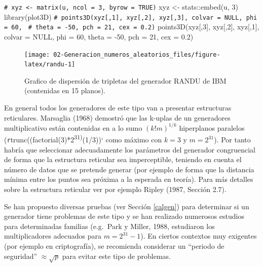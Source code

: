 \documentclass[
]{book}
\newenvironment{Shaded}{\begin{snugshade}}{\end{snugshade}}
\newcommand{\AttributeTok}[1]{\textcolor[rgb]{0.77,0.63,0.00}{#1}}
\newcommand{\CommentTok}[1]{\textcolor[rgb]{0.56,0.35,0.01}{\textit{#1}}}
\newcommand{\ConstantTok}[1]{\textcolor[rgb]{0.00,0.00,0.00}{#1}}
\newcommand{\DecValTok}[1]{\textcolor[rgb]{0.00,0.00,0.81}{#1}}
\newcommand{\FloatTok}[1]{\textcolor[rgb]{0.00,0.00,0.81}{#1}}
\newcommand{\FunctionTok}[1]{\textcolor[rgb]{0.00,0.00,0.00}{#1}}
\newcommand{\NormalTok}[1]{#1}
\newcommand{\OtherTok}[1]{\textcolor[rgb]{0.56,0.35,0.01}{#1}}
\newcommand{\SpecialCharTok}[1]{\textcolor[rgb]{0.00,0.00,0.00}{#1}}
\theoremstyle{break}
\theoremstyle{nonumberplain}
\renewcommand{\CommentTok}[1]{\textcolor[rgb]{0.41,0.41,0.41}{\texttt{#1}}}
\begin{document}
\begin{Shaded}
\begin{Highlighting}[]
\CommentTok{\# xyz \textless{}{-} matrix(u, ncol = 3, byrow = TRUE)}
\NormalTok{xyz }\OtherTok{\textless{}{-}}\NormalTok{ stats}\SpecialCharTok{::}\FunctionTok{embed}\NormalTok{(u, }\DecValTok{3}\NormalTok{)}
\FunctionTok{library}\NormalTok{(plot3D)}
\CommentTok{\# points3D(xyz[,1], xyz[,2], xyz[,3], colvar = NULL, phi = 60, }
\CommentTok{\#          theta = {-}50, pch = 21, cex = 0.2)}
\FunctionTok{points3D}\NormalTok{(xyz[,}\DecValTok{3}\NormalTok{], xyz[,}\DecValTok{2}\NormalTok{], xyz[,}\DecValTok{1}\NormalTok{], }\AttributeTok{colvar =} \ConstantTok{NULL}\NormalTok{, }\AttributeTok{phi =} \DecValTok{60}\NormalTok{, }
         \AttributeTok{theta =} \SpecialCharTok{{-}}\DecValTok{50}\NormalTok{, }\AttributeTok{pch =} \DecValTok{21}\NormalTok{, }\AttributeTok{cex =} \FloatTok{0.2}\NormalTok{)}
\end{Highlighting}
\end{Shaded}

\begin{figure}[!htb]

{\centering \texttt{[image: 02-Generacion\_numeros\_aleatorios\_files/figure-latex/randu-1]} 

}

\caption{Grafico de dispersión de tripletas del generador RANDU de IBM (contenidas en 15 planos).}\label{fig:randu}
\end{figure}

En general todos los generadores de este tipo van a presentar estructuras reticulares.
Marsaglia (1968) demostró que las k-uplas de un generadores multiplicativo están contenidas en a lo sumo \(\left(k!m\right)^{1/k}\) hiperplanos paralelos (\texttt{r}trunc((factorial(3)*2\textsuperscript{31)}(1/3))` como máximo con \(k=3\) y \(m=2^{31}\)).
Por tanto habría que seleccionar adecuadamente los parámetros del generador congruencial de forma que la estructura reticular sea imperceptible, teniendo en cuenta el número de datos que se pretende generar (por ejemplo de forma que la distancia mínima entre los puntos sea próxima a la esperada en teoría).
Para más detalles sobre la estructura reticular ver por ejemplo Ripley (1987, Sección 2.7).

Se han propuesto diversas pruebas (ver Sección \ref{calgen}) para
determinar si un generador tiene problemas de este tipo y se han
realizado numerosos estudios para determinadas familias (e.g.~Park y
Miller, 1988, estudiaron los multiplicadores adecuados para \(m=2^{31}-1\)).
En ciertos contextos muy exigentes (por ejemplo en criptografía), se recomienda considerar un ``periodo de seguridad'' \(\approx \sqrt{p}\) para evitar este tipo de problemas.
\end{document}
